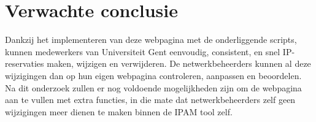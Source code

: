 \documentclass{hogent-article}
\begin{document}
\section{Verwachte conclusie}
\label{sec:discussie-conclusie}
Dankzij het implementeren van deze webpagina met de onderliggende scripts, kunnen medewerkers van Universiteit Gent eenvoudig, consistent, en snel IP-reservaties maken, wijzigen en verwijderen. De netwerkbeheerders kunnen al deze wijzigingen dan op hun eigen webpagina controleren, aanpassen en beoordelen.
Na dit onderzoek zullen er nog voldoende mogelijkheden zijn om de webpagina aan te vullen met extra functies, in die mate dat netwerkbeheerders zelf geen wijzigingen meer dienen te maken binnen de IPAM tool zelf.


\printbibliography[heading=bibintoc]
\end{document}

